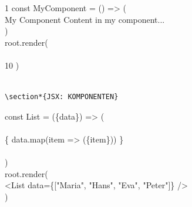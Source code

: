 1 const MyComponent = () => (\\

My Component
Content in my component...
\\
)\\
root.render(\\
\\
10 )

\begin{verbatim}

\section*{JSX: KOMPONENTEN}
\end{verbatim}

const List = (\{data\}) => (\\
\\
\{ data.map(item => (\{item\})) \}\\
\\
)\\
root.render(\\[0pt]
<List data=\{["Maria", "Hans", "Eva", "Peter"]\} />\\
)

